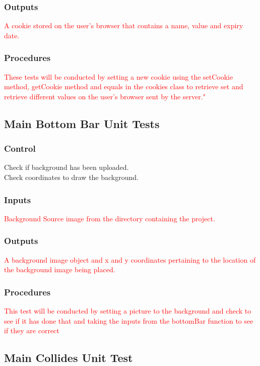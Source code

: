 \documentclass[11pt, oneside]{article}   	%
\begin{document}
\subsubsection{Outputs}
\textcolor{red}{A cookie stored on the user's browser that contains a name, value and expiry date.}
\subsubsection{Procedures}
\textcolor{red}{These tests will be conducted by setting a new cookie using the setCookie method, getCookie method and equals in the cookies class to retrieve set and retrieve different values on the user's browser sent by the server."}



\subsection{Main Bottom Bar Unit Tests}
\subsubsection{Control}
Check if background has been uploaded. \\
Check coordinates to draw the background.

\subsubsection{Inputs}
\textcolor{red}{Background Source image from the directory containing the project.}

\subsubsection{Outputs}
\textcolor{red}{A background image object and x and y coordinates pertaining to the location of the background image being placed.}

\subsubsection{Procedures}
\textcolor{red}{This test will be conducted by setting a picture to the background and check to see if it has done that and taking the inputs from the bottomBar function to see if they are correct}

\subsection{Main Collides Unit Test}
\end{document}
